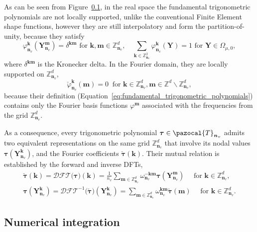 As can be seen from Figure~\ref{}, in the real space the fundamental trigonometric polynomials are not locally supported, unlike the conventional Finite Element shape functions, however they are still interpolatory and form the partition-of-unity, because they satisfy
\begin{equation} \label{eq:delta_property}
\varphi_{\bm n_v}^{\bm  k}\left(\bm   Y_{\bm n_v}^{\bm  m}\right)=\delta^{\bm  k \bm  m} \text { for } \bm  k, \bm  m \in \mathbb{Z}_{\bm n_v}^{d}, \quad \sum_{\bm  k \in \mathbb{Z}_{\bm n_v}^{2}} \varphi_{\bm n_v}^{\bm  k}(\bm Y)=1 \text { for } \bm Y \in \Omega_{\mu,0},
\end{equation}
where \(\delta^{\bm  k \bm  m}\) is the Kronecker delta.
In the Fourier domain, they are locally supported on \(\mathbb{Z}_{\bm n_v}^{d}\),
\begin{equation} \label{eq:basis_functions_compact_suppport}
\breve{\varphi}_{\bm n_v}^{\bm  k}(\bm{ m})=0\ \text { for } \bm{ k} \in \mathbb{Z}_{\bm n_v}^{d}, \bm  m \in \mathbb{Z}^{d} \backslash \mathbb{Z}_{\bm n_v}^{d},
\end{equation}
because their definition (Equation~\eqref{eq:fundamental_trigonometric_polynomials}) contains only the Fourier basis functions \(\varphi^{\bm  m}\) associated with the frequencies from the grid \(\mathbb{Z}_{\bm n_v}^{d}\).

As a consequence, every trigonometric polynomial \(\bm\tau \in \pazocal{T}_{\bm n_v}\) admits two equivalent representations on the same grid \(\mathbb{Z}_{\bm n_v}^{d}\) that involve its nodal values \(\bm\tau\left(\bm{Y}_{\bm n_v}^{\bm{ k}}\right)\), and the Fourier coefficients \(\breve{\bm{\tau}}(\bm{ k})\).
Their mutual relation is established by the forward and inverse DFTs,
\begin{gather} \label{eq:forward_fft}
\breve{\bm\tau}(\bm{ k})=\mathcal{DFT}\big (\bm \tau\big )(\bm k)=\frac{1}{n_v} \sum_{\bm  m \in \mathbb{Z}_{\bm n_v}^{d}} \omega_{\bm n_v}^{-\bm  k \bm  m} \bm{\tau}\left(\bm{Y}_{\bm n_v}^{\bm  m}\right)\quad \text { for } \bm{ k} \in \mathbb{Z}_{\bm n_v}^{d},\\
\label{eq:backward_fft}
 \bm{\tau}\left(\bm{Y}_{\bm n_v}^{\bm{ k}}\right)=\mathcal{DFT}^{-1}\big (\breve{\bm \tau}\big )(\bm{Y}_{\bm n_v}^{\bm{ k}})=\sum_{\bm  m \in \mathbb{Z}_{\bm n_v}^{d}} \omega_{\bm n_v}^{\bm  k \bm  m} \breve{\bm{\tau}}(\bm{ m})\quad \text { for } \bm{ k} \in \mathbb{Z}_{\bm n_v}^{d}.
\end{gather}

\subsection{Numerical integration}

